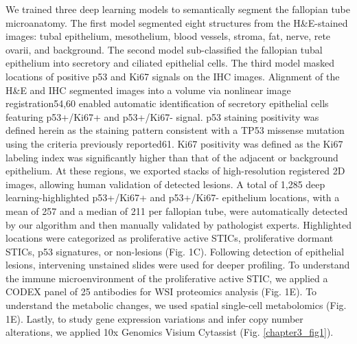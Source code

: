 \begin{refsection}
    We trained three deep learning models to semantically segment the fallopian tube microanatomy. The first model segmented eight structures from the H\&E-stained images: tubal epithelium, mesothelium, blood vessels, stroma, fat, nerve, rete ovarii, and background. The second model sub-classified the fallopian tubal epithelium into secretory and ciliated epithelial cells. The third model masked locations of positive p53 and Ki67 signals on the IHC images. Alignment of the H\&E and IHC segmented images into a volume via nonlinear image registration54,60 enabled automatic identification of secretory epithelial cells featuring p53+/Ki67+ and p53+/Ki67- signal. p53 staining positivity was defined herein as the staining pattern consistent with a TP53 missense mutation using the criteria previously reported61. Ki67 positivity was defined as the Ki67 labeling index was significantly higher than that of the adjacent or background epithelium. At these regions, we exported stacks of high-resolution registered 2D images, allowing human validation of detected lesions. A total of 1,285 deep learning-highlighted p53+/Ki67+ and p53+/Ki67- epithelium locations, with a mean of 257 and a median of 211 per fallopian tube, were automatically detected by our algorithm and then manually validated by pathologist experts. Highlighted locations were categorized as proliferative active STICs, proliferative dormant STICs, p53 signatures, or non-lesions (Fig. 1C). 
    Following detection of epithelial lesions, intervening unstained slides were used for deeper profiling. To understand the immune microenvironment of the proliferative active STIC, we applied a CODEX panel of 25 antibodies for WSI proteomics analysis (Fig. 1E). To understand the metabolic changes, we used spatial single-cell metabolomics (Fig. 1E). Lastly, to study gene expression variations and infer copy number alterations, we applied 10x Genomics Visium Cytassist (Fig. \ref{chapter3_fig1}).
    

\end{refsection}
